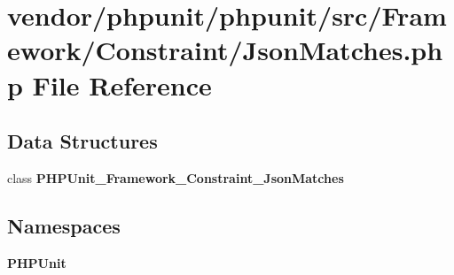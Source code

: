 \section{vendor/phpunit/phpunit/src/\+Framework/\+Constraint/\+Json\+Matches.php File Reference}
\label{_json_matches_8php}
\subsection*{Data Structures}
\begin{DoxyCompactItemize}
\item 
class {\bf P\+H\+P\+Unit\+\_\+\+Framework\+\_\+\+Constraint\+\_\+\+Json\+Matches}
\end{DoxyCompactItemize}
\subsection*{Namespaces}
\begin{DoxyCompactItemize}
\item 
 {\bf P\+H\+P\+Unit}
\end{DoxyCompactItemize}
